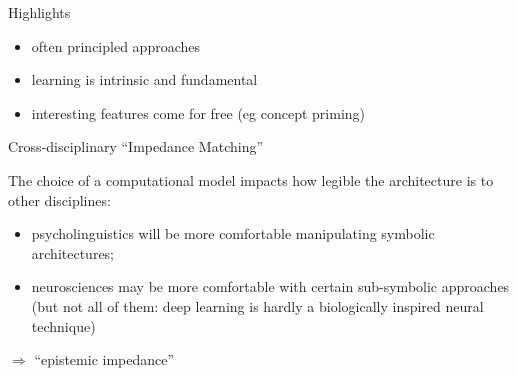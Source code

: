\documentclass[compress]{beamer}
\begin{document}
\begin{frame}{Highlights}
    \begin{itemize}
        \item often {\Medium principled approaches}
        \item {\Medium learning} is intrinsic and fundamental
        \item {\Medium interesting features} come for free (eg concept priming)
    \end{itemize}
\end{frame}

\begin{frame}{Cross-disciplinary ``Impedance Matching''}

    The choice of a computational model impacts how {\Medium legible} the architecture is
    to other disciplines:

    \begin{itemize}
        \item {\Medium psycholinguistics} will be more comfortable manipulating
            symbolic architectures;
        \item {\Medium neurosciences} may be more comfortable with certain
            sub-symbolic approaches (but not all of them: deep learning 
            is hardly a biologically inspired neural technique)
    \end{itemize}
    
    {\Medium $\Rightarrow$ ``epistemic impedance''}




\end{frame}
\end{document}
